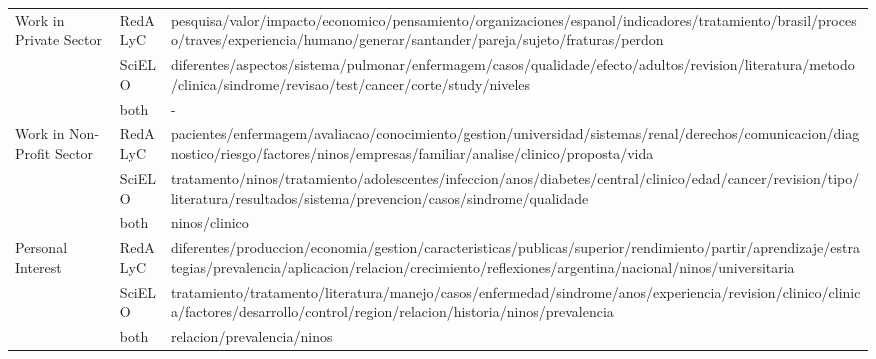 \begin{longtable}{@{}lp{2.5cm}p{6.5cm}@{}}
Work in Private Sector  &   RedALyC &   pesquisa{\slash}valor{\slash}impacto{\slash}economico{\slash}pensamiento{\slash}organizaciones{\slash}espanol{\slash}indicadores{\slash}tratamiento{\slash}brasil{\slash}proceso{\slash}traves{\slash}experiencia{\slash}humano{\slash}generar{\slash}santander{\slash}pareja{\slash}sujeto{\slash}fraturas{\slash}perdon \\
    &   SciELO  &   diferentes{\slash}aspectos{\slash}sistema{\slash}pulmonar{\slash}enfermagem{\slash}casos{\slash}qualidade{\slash}efecto{\slash}adultos{\slash}revision{\slash}literatura{\slash}metodo{\slash}clinica{\slash}sindrome{\slash}revisao{\slash}test{\slash}cancer{\slash}corte{\slash}study{\slash}niveles \\
    &   both    &   - \\ \hline
Work in Non-Profit Sector   &   RedALyC &   pacientes{\slash}enfermagem{\slash}avaliacao{\slash}conocimiento{\slash}gestion{\slash}universidad{\slash}sistemas{\slash}renal{\slash}derechos{\slash}comunicacion{\slash}diagnostico{\slash}riesgo{\slash}factores{\slash}ninos{\slash}empresas{\slash}familiar{\slash}analise{\slash}clinico{\slash}proposta{\slash}vida \\
    &   SciELO  &   tratamento{\slash}ninos{\slash}tratamiento{\slash}adolescentes{\slash}infeccion{\slash}anos{\slash}diabetes{\slash}central{\slash}clinico{\slash}edad{\slash}cancer{\slash}revision{\slash}tipo{\slash}literatura{\slash}resultados{\slash}sistema{\slash}prevencion{\slash}casos{\slash}sindrome{\slash}qualidade \\
    &   both    &   ninos{\slash}clinico \\ \hline
Personal Interest   &   RedALyC &   diferentes{\slash}produccion{\slash}economia{\slash}gestion{\slash}caracteristicas{\slash}publicas{\slash}superior{\slash}rendimiento{\slash}partir{\slash}aprendizaje{\slash}estrategias{\slash}prevalencia{\slash}aplicacion{\slash}relacion{\slash}crecimiento{\slash}reflexiones{\slash}argentina{\slash}nacional{\slash}ninos{\slash}universitaria \\
    &   SciELO  &   tratamiento{\slash}tratamento{\slash}literatura{\slash}manejo{\slash}casos{\slash}enfermedad{\slash}sindrome{\slash}anos{\slash}experiencia{\slash}revision{\slash}clinico{\slash}clinica{\slash}factores{\slash}desarrollo{\slash}control{\slash}region{\slash}relacion{\slash}historia{\slash}ninos{\slash}prevalencia \\
    &   both    &   relacion{\slash}prevalencia{\slash}ninos \\
\end{longtable}


